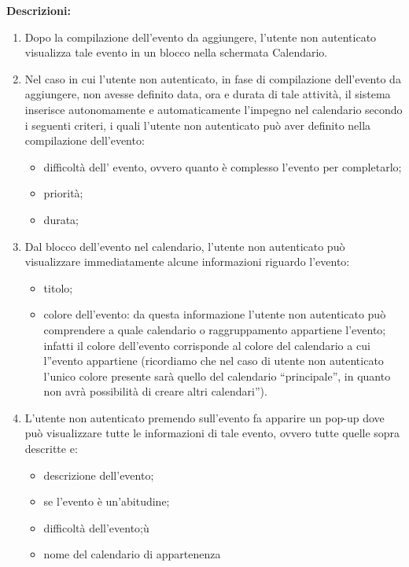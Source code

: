 \begin{listaPersonale}[UC]{}
    \textbf{Descrizioni:}
    \begin{enumerate}
        \item Dopo la compilazione dell'evento da aggiungere, l'utente non autenticato visualizza tale evento in un blocco nella schermata Calendario.
        \item Nel caso in cui l'utente non autenticato, in fase di compilazione dell'evento da aggiungere, non avesse definito data, ora e durata di tale attività, il sistema inserisce autonomamente e automaticamente l'impegno nel calendario secondo i seguenti criteri, i quali l'utente non autenticato può aver definito nella compilazione dell'evento:
              \begin{itemize}
                  \item difficoltà dell' evento, ovvero quanto è complesso l'evento per completarlo;
                  \item priorità;
                  \item durata;
              \end{itemize}
        \item Dal blocco dell'evento nel calendario, l'utente non autenticato può visualizzare immediatamente alcune informazioni riguardo l'evento:
              \begin{itemize}
                  \item titolo;
                  \item colore dell'evento: da questa informazione l'utente non autenticato può comprendere a quale calendario o raggruppamento appartiene l'evento; infatti il colore dell'evento corrisponde al colore del calendario a cui l''evento appartiene (ricordiamo che nel caso di utente non autenticato l'unico colore presente sarà quello del calendario “principale”, in quanto non avrà possibilità di creare altri calendari”).
              \end{itemize}
        \item L'utente non autenticato premendo sull'evento fa apparire un pop-up dove può visualizzare tutte le informazioni di tale evento, ovvero tutte quelle sopra descritte e:
              \begin{itemize}
                  \item descrizione dell'evento;
                  \item se l'evento è un'abitudine;
                  \item difficoltà dell'evento;ù
                  \item nome del calendario di appartenenza

\end{itemize}
\end{enumerate}
\end{listaPersonale}
